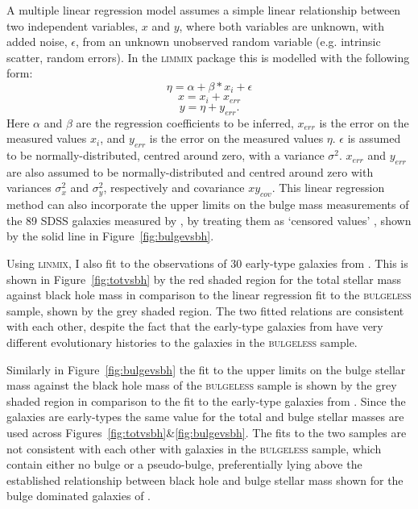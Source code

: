 {A multiple linear regression model assumes a simple linear relationship between two independent variables, $x$ and $y$, where both variables are unknown, with added noise, $\epsilon$, from an unknown unobserved random variable (e.g. intrinsic scatter, random errors). In the \textsc{limmix} package this is modelled with the following form:
\begin{equation}\label{2dlinemodel}
\eta = \alpha + \beta * x_i + \epsilon
\end{equation}
\begin{equation}\label{2dlinemodel2}
x = x_i + x_{err}
\end{equation}
\begin{equation}\label{2dlinemodel3}
y = \eta + y_{err}.
\end{equation}
Here $\alpha$ and $\beta$ are the regression coefficients to be inferred, $x_{err}$ is the error on the measured values $x_i$, and $y_{err}$ is the error on the measured values $\eta$. $\epsilon$ is assumed to be normally-distributed, centred around zero, with a variance $\sigma^2$. $x_{err}$ and $y_{err}$ are also assumed to be normally-distributed and centred around zero with variances $\sigma_x^2$ and $\sigma_y^2$, respectively and covariance $xy_{cov}$. This linear regression method can also incorporate the upper limits on the bulge mass measurements of the 89 SDSS galaxies measured by \citet[][see Section \ref{sec:galmass}]{simard11},  by treating them as `censored values' \citep[see Section 7.2 of][]{kelly07}, shown by the solid line in Figure~\ref{fig:bulgevsbh}.

Using \textsc{linmix}, I also fit to the observations of 30 early-type galaxies from \citet{haringrix04}. This is shown in Figure~\ref{fig:totvsbh} by the red shaded region for the total stellar mass against black hole mass in comparison to the linear regression fit to the \textsc{bulgeless} sample, shown by the grey shaded region. The two fitted relations are consistent with each other, despite the fact that the early-type galaxies from \citeauthor{haringrix04} have very different evolutionary histories to the galaxies in the \textsc{bulgeless} sample.  

Similarly in Figure~\ref{fig:bulgevsbh} the fit to the upper limits on the bulge stellar mass against the black hole mass of the \textsc{bulgeless} sample is shown by the grey shaded region in comparison to the fit to the early-type galaxies from \citet{haringrix04}. Since the \citeauthor{haringrix04} galaxies are early-types the same value for the total and bulge stellar masses are used across Figures~\ref{fig:totvsbh}\&\ref{fig:bulgevsbh}. The fits to the two samples are not consistent with each other with galaxies in the \textsc{bulgeless} sample, which contain either no bulge or a pseudo-bulge, preferentially lying above the established relationship between black hole and bulge stellar mass shown for the bulge dominated galaxies of \citet{haringrix04}. 

}
